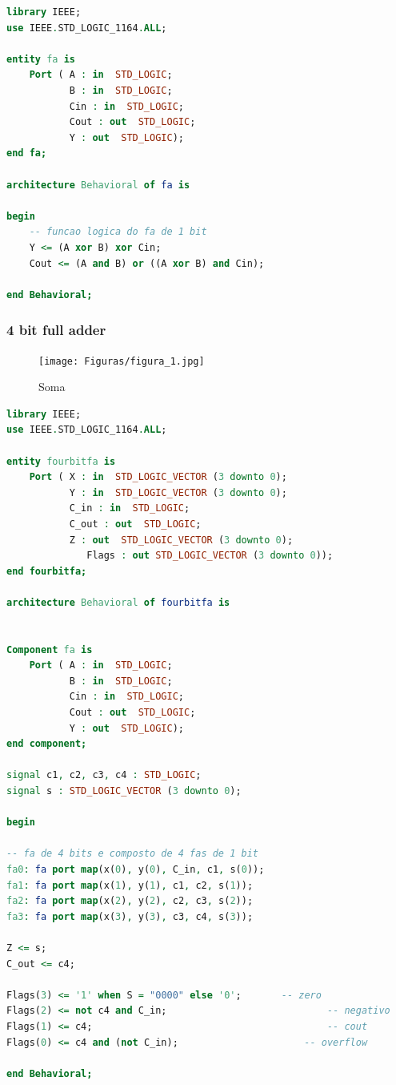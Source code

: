 \documentclass[a4paper, 12pt]{article}
\begin{document}
\begin{lstlisting}[language=VHDL]
library IEEE;
use IEEE.STD_LOGIC_1164.ALL;

entity fa is
    Port ( A : in  STD_LOGIC;
           B : in  STD_LOGIC;
           Cin : in  STD_LOGIC;
           Cout : out  STD_LOGIC;
           Y : out  STD_LOGIC);
end fa;

architecture Behavioral of fa is

begin
	-- funcao logica do fa de 1 bit
	Y <= (A xor B) xor Cin;
	Cout <= (A and B) or ((A xor B) and Cin);
	
end Behavioral;
\end{lstlisting}


\subsubsection{4 bit full adder}


\begin{figure}[H]
\caption{Soma}
\centering
\texttt{[image: Figuras/figura\_1.jpg]}
\label{figura:qualquernome}
\end{figure}


\begin{lstlisting}[language=VHDL]
    library IEEE;
use IEEE.STD_LOGIC_1164.ALL;

entity fourbitfa is
    Port ( X : in  STD_LOGIC_VECTOR (3 downto 0);
           Y : in  STD_LOGIC_VECTOR (3 downto 0);
           C_in : in  STD_LOGIC;
           C_out : out  STD_LOGIC;
           Z : out  STD_LOGIC_VECTOR (3 downto 0);
			  Flags : out STD_LOGIC_VECTOR (3 downto 0));
end fourbitfa;

architecture Behavioral of fourbitfa is


Component fa is
    Port ( A : in  STD_LOGIC;
           B : in  STD_LOGIC;
           Cin : in  STD_LOGIC;
           Cout : out  STD_LOGIC;
           Y : out  STD_LOGIC);
end component;

signal c1, c2, c3, c4 : STD_LOGIC;
signal s : STD_LOGIC_VECTOR (3 downto 0);

begin

-- fa de 4 bits e composto de 4 fas de 1 bit
fa0: fa port map(x(0), y(0), C_in, c1, s(0));
fa1: fa port map(x(1), y(1), c1, c2, s(1));
fa2: fa port map(x(2), y(2), c2, c3, s(2));
fa3: fa port map(x(3), y(3), c3, c4, s(3));

Z <= s;
C_out <= c4;

Flags(3) <= '1' when S = "0000" else '0'; 		-- zero
Flags(2) <= not c4 and C_in;							-- negativo
Flags(1) <= c4;											-- cout
Flags(0) <= c4 and (not C_in); 						-- overflow

end Behavioral;
\end{lstlisting}
\end{document}
